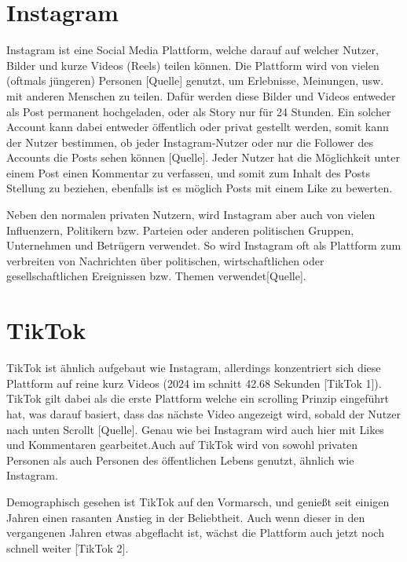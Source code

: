 \documentclass[12pt]{report}
\begin{document}
\section{Instagram}
Instagram ist eine Social Media Plattform, welche darauf auf welcher Nutzer, Bilder und kurze Videos (Reels) teilen können. Die Plattform wird von vielen (oftmals jüngeren) Personen [Quelle] genutzt, um Erlebnisse, Meinungen, usw. mit anderen Menschen zu teilen. Dafür werden diese Bilder und Videos entweder als Post permanent hochgeladen, oder als Story nur für 24 Stunden. Ein solcher Account kann dabei entweder öffentlich oder privat gestellt werden, somit kann der Nutzer bestimmen, ob jeder Instagram-Nutzer oder nur die Follower des Accounts die Posts sehen können [Quelle]. 
Jeder Nutzer hat die Möglichkeit unter einem Post einen Kommentar zu verfassen, und somit zum Inhalt des Posts Stellung zu beziehen, ebenfalls ist es möglich Posts mit einem Like zu bewerten.
\newline

Neben den normalen privaten Nutzern, wird Instagram aber auch von vielen Influenzern, Politikern bzw. Parteien oder anderen politischen Gruppen, Unternehmen und Betrügern verwendet. So wird Instagram oft als Plattform zum verbreiten von Nachrichten über politischen, wirtschaftlichen oder gesellschaftlichen Ereignissen bzw. Themen verwendet[Quelle].
\newline


\section{TikTok}
\label{TikTokAllgemein}
TikTok ist ähnlich aufgebaut wie Instagram, allerdings konzentriert sich diese Plattform auf reine kurz Videos (2024 im schnitt 42.68 Sekunden [TikTok 1]). TikTok gilt dabei als die erste Plattform welche ein scrolling Prinzip eingeführt hat, was darauf basiert, dass das nächste Video angezeigt wird, sobald der Nutzer nach unten Scrollt [Quelle]. Genau wie bei Instagram wird auch hier mit Likes und Kommentaren gearbeitet.Auch auf TikTok wird von sowohl privaten Personen als auch Personen des öffentlichen Lebens genutzt, ähnlich wie Instagram.
\newline

Demographisch gesehen ist TikTok auf den Vormarsch, und genießt seit einigen Jahren einen rasanten Anstieg in der Beliebtheit.
Auch wenn dieser in den vergangenen Jahren etwas abgeflacht ist, wächst die Plattform auch jetzt noch schnell weiter [TikTok 2].
 
\end{document}
